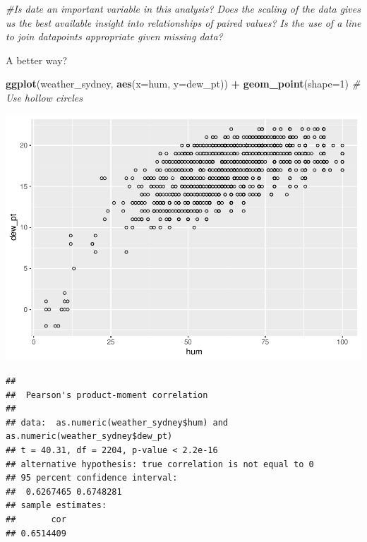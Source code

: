 \documentclass[]{article}
\newenvironment{Shaded}{\begin{snugshade}}{\end{snugshade}}
\newcommand{\CommentTok}[1]{\textcolor[rgb]{0.56,0.35,0.01}{\textit{#1}}}
\newcommand{\DataTypeTok}[1]{\textcolor[rgb]{0.13,0.29,0.53}{#1}}
\newcommand{\DecValTok}[1]{\textcolor[rgb]{0.00,0.00,0.81}{#1}}
\newcommand{\KeywordTok}[1]{\textcolor[rgb]{0.13,0.29,0.53}{\textbf{#1}}}
\newcommand{\NormalTok}[1]{#1}
\newcommand{\OperatorTok}[1]{\textcolor[rgb]{0.81,0.36,0.00}{\textbf{#1}}}
\newcommand{\StringTok}[1]{\textcolor[rgb]{0.31,0.60,0.02}{#1}}
\begin{document}
\begin{Shaded}
\begin{Highlighting}[]
\CommentTok{#Is date an important variable in this analysis? Does the scaling of the data gives us the best available insight into relationships of paired values? Is the use of a line to join datapoints appropriate given missing data?}
\end{Highlighting}
\end{Shaded}

A better way?

\begin{Shaded}
\begin{Highlighting}[]
\KeywordTok{ggplot}\NormalTok{(weather_sydney, }\KeywordTok{aes}\NormalTok{(}\DataTypeTok{x=}\NormalTok{hum, }\DataTypeTok{y=}\NormalTok{dew_pt)) }\OperatorTok{+}
\StringTok{    }\KeywordTok{geom_point}\NormalTok{(}\DataTypeTok{shape=}\DecValTok{1}\NormalTok{)      }\CommentTok{# Use hollow circles}
\end{Highlighting}
\end{Shaded}

\includegraphics{AT2_template__medium__files/figure-latex/unnamed-chunk-9-1.pdf}

\begin{Shaded}
\end{Shaded}

\begin{verbatim}
## 
##  Pearson's product-moment correlation
## 
## data:  as.numeric(weather_sydney$hum) and as.numeric(weather_sydney$dew_pt)
## t = 40.31, df = 2204, p-value < 2.2e-16
## alternative hypothesis: true correlation is not equal to 0
## 95 percent confidence interval:
##  0.6267465 0.6748281
## sample estimates:
##       cor 
## 0.6514409
\end{verbatim}
\end{document}
